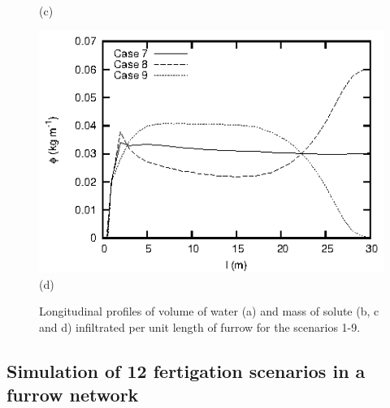 \documentclass[review,authoryear]{elsarticle}
\begin{document}
\begin{figure}[ht!]
\begin{minipage}{0.49\textwidth}
(c)
\end{minipage}
\begin{minipage}{0.49\textwidth}
\centering
\includegraphics{fertilizer789.eps}
(d)
\end{minipage}
\caption{Longitudinal profiles of volume of water (a) and mass of solute
(b, c and d) infiltrated per unit length of furrow for the scenarios 1-9.}
\label{FigCases}
\end{figure}

\subsection{Simulation of 12 fertigation scenarios in a furrow network}
\end{document}
